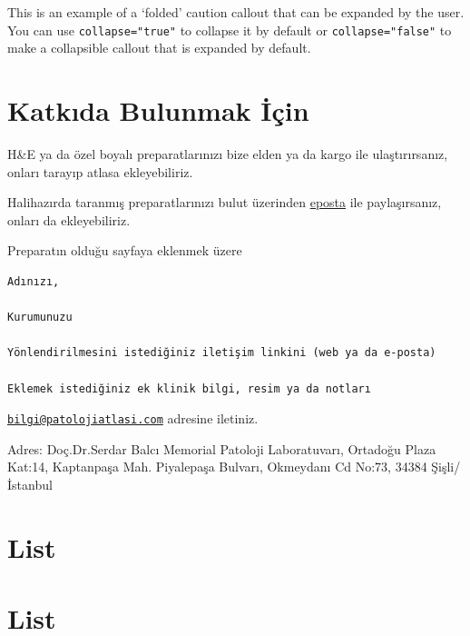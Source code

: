 \documentclass[
  letterpaper,
  DIV=11,
  numbers=noendperiod]{scrreprt}
\begin{document}
\begin{tcolorbox}[enhanced jigsaw, titlerule=0mm, arc=.35mm, leftrule=.75mm, toptitle=1mm, bottomrule=.15mm, colback=white, colframe=quarto-callout-caution-color-frame, bottomtitle=1mm, title=\textcolor{quarto-callout-caution-color}{\faFire}\hspace{0.5em}{Expand To Learn About Collapse}, rightrule=.15mm, coltitle=black, opacitybacktitle=0.6, toprule=.15mm, colbacktitle=quarto-callout-caution-color!10!white, left=2mm, opacityback=0, breakable]
This is an example of a `folded' caution callout that can be expanded by
the user. You can use \texttt{collapse="true"} to collapse it by default
or \texttt{collapse="false"} to make a collapsible callout that is
expanded by default.
\end{tcolorbox}

\hypertarget{katkux131da-bulunmak-iuxe7in}{%
\chapter{Katkıda Bulunmak İçin}\label{katkux131da-bulunmak-iuxe7in}}

H\&E ya da özel boyalı preparatlarınızı bize elden ya da kargo ile
ulaştırırsanız, onları tarayıp atlasa ekleyebiliriz.

Halihazırda taranmış preparatlarınızı bulut üzerinden
\href{mailto:bilgi@patolojiatlasi.com}{eposta} ile paylaşırsanız, onları
da ekleyebiliriz.

Preparatın olduğu sayfaya eklenmek üzere

\begin{verbatim}
Adınızı,

Kurumunuzu

Yönlendirilmesini istediğiniz iletişim linkini (web ya da e-posta)

Eklemek istediğiniz ek klinik bilgi, resim ya da notları
\end{verbatim}

\href{mailto:bilgi@patolojiatlasi.com}{\nolinkurl{bilgi@patolojiatlasi.com}}
adresine iletiniz.

Adres: Doç.Dr.Serdar Balcı Memorial Patoloji Laboratuvarı, Ortadoğu
Plaza Kat:14, Kaptanpaşa Mah. Piyalepaşa Bulvarı, Okmeydanı Cd No:73,
34384 Şişli/İstanbul

\hypertarget{section-4}{%
\chapter{}\label{section-4}}

\hypertarget{list}{%
\chapter{List}\label{list}}

\hypertarget{list-1}{%
\chapter{List}\label{list-1}}
\end{document}
